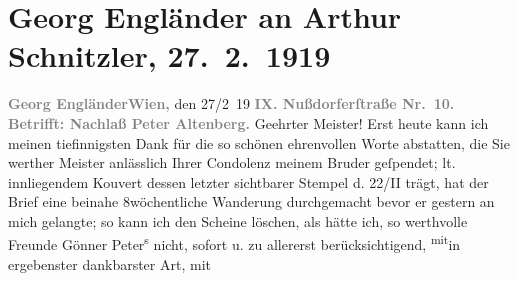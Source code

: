 

               \section[Georg Engländer an Arthur Schnitzler, 27. 2. 1919]{ Georg Engländer an Arthur Schnitzler, 27. 2. 1919}\nopagebreak{}\rehead{ }\begin{ledgroupsized}[t]{13cm}\normalsize\beginnumbering{} \toendnotes[C]{\smallbreak\pagebreak[2]} 
\toendnotes[C]{\smallbreak}\pstart
           \noindent{}{\pb}\textcolor{gray}{\textbf{Georg
                                Engländer}}\hfill \textcolor{gray}{\textbf{Wien,}} den 27/2 19\pend
           \pstart
           \textcolor{gray}{\textbf{IX. Nußdorferſtraße
                                Nr. 10.}}\pend
           \pstart
           \textcolor{gray}{\textbf{Betrifft: Nachlaß \textbf{Peter Altenberg}.}}\pend
           \pstart{}Geehrter Meister!\pend\pstart
           Erst heute kann ich meinen tiefinnigsten Dank für die so schönen {\kaufmannsund} ehrenvollen Worte abstatten, die Sie werther
                    Meister anlässlich Ihrer Condolenz meinem Bruder geſpendet; lt. innliegendem Kouvert dessen
                    letzter sichtbarer Stempel d. 22/II trägt, hat der Brief eine
                    beinahe 8wöchentliche Wanderung durchgemacht bevor er gestern an mich gelangte;
                    so kann ich den Scheine löschen, als hätte ich, so werthvolle Freunde {\kaufmannsund} Gönner Peter\textsuperscript{s} nicht, sofort u. zu allererst
                    berücksichtigend, \substVorne{}\textsuperscript{mit}\substDazwischen{}in\substHinten{} ergebenster {\kaufmannsund} dankbarster Art, mit

\end{ledgroupsized}
